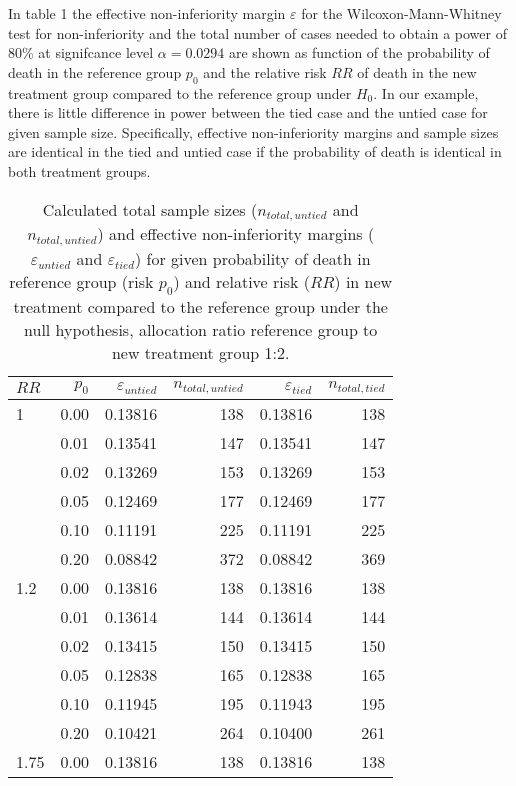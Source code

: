 \documentclass[bimj,fleqn]{w-art}\usepackage[]{graphicx}\usepackage[]{color}
\theoremstyle{plain}
\theoremstyle{definition}
\begin{document}
In table 1 the effective non-inferiority margin $\varepsilon$ for the
Wilcoxon-Mann-Whitney test for non-inferiority and the total number of cases
needed to obtain a power of 80\% at signifcance level $\alpha = 0.0294$ are
shown as function of the probability of death in the reference group $p_0$ and
the relative risk $RR$ of death in the new treatment group compared to the
reference group under $H_0$.
In our example, there is little difference in power between the tied case
and the untied case for given sample size. Specifically, effective
non-inferiority margins and sample sizes are identical in the tied and untied
case if the probability of death is identical in both treatment groups.


\begin{table}[ht]
\centering
\caption{Calculated total sample sizes ($n_{total, untied}$ and
$n_{total, untied}$) and effective non-inferiority margins
($\varepsilon_{untied}$ and $\varepsilon_{tied}$)
for given probability of death in reference group (risk $p_0$) and
relative risk ($RR$) in new treatment compared to the reference group under the
null hypothesis, allocation ratio reference group
to new treatment group 1:2.} 
\begin{tabular}{lrrrrr}
  \hline
$RR$ & $p_0$ & $\varepsilon_{untied}$ & $n_{total, untied}$ & $\varepsilon_{tied}$ & $n_{total, tied}$ \\ 
  \hline
1 & 0.00 & 0.13816 & 138 & 0.13816 & 138 \\ 
    & 0.01 & 0.13541 & 147 & 0.13541 & 147 \\ 
    & 0.02 & 0.13269 & 153 & 0.13269 & 153 \\ 
    & 0.05 & 0.12469 & 177 & 0.12469 & 177 \\ 
    & 0.10 & 0.11191 & 225 & 0.11191 & 225 \\ 
    & 0.20 & 0.08842 & 372 & 0.08842 & 369 \\ 
  1.2 & 0.00 & 0.13816 & 138 & 0.13816 & 138 \\ 
    & 0.01 & 0.13614 & 144 & 0.13614 & 144 \\ 
    & 0.02 & 0.13415 & 150 & 0.13415 & 150 \\ 
    & 0.05 & 0.12838 & 165 & 0.12838 & 165 \\ 
    & 0.10 & 0.11945 & 195 & 0.11943 & 195 \\ 
    & 0.20 & 0.10421 & 264 & 0.10400 & 261 \\ 
  1.75 & 0.00 & 0.13816 & 138 & 0.13816 & 138 \\ 

\end{tabular}
\end{table}
\end{document}
